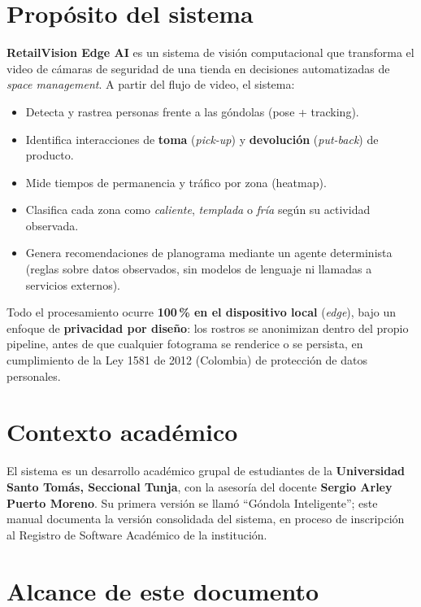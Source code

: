 \documentclass[11pt,a4paper]{report}
\begin{document}
\section{Propósito del sistema}

\textbf{RetailVision Edge AI} es un sistema de visión computacional que transforma el video de
cámaras de seguridad de una tienda en decisiones automatizadas de \textit{space management}.
A partir del flujo de video, el sistema:

\begin{itemize}
  \item Detecta y rastrea personas frente a las góndolas (pose + tracking).
  \item Identifica interacciones de \textbf{toma} (\textit{pick-up}) y \textbf{devolución}
        (\textit{put-back}) de producto.
  \item Mide tiempos de permanencia y tráfico por zona (heatmap).
  \item Clasifica cada zona como \textit{caliente}, \textit{templada} o \textit{fría} según su
        actividad observada.
  \item Genera recomendaciones de planograma mediante un agente determinista (reglas sobre datos
        observados, sin modelos de lenguaje ni llamadas a servicios externos).
\end{itemize}

Todo el procesamiento ocurre \textbf{100\,\% en el dispositivo local} (\textit{edge}), bajo un
enfoque de \textbf{privacidad por diseño}: los rostros se anonimizan dentro del propio pipeline,
antes de que cualquier fotograma se renderice o se persista, en cumplimiento de la Ley 1581 de
2012 (Colombia) de protección de datos personales.

\section{Contexto académico}

El sistema es un desarrollo académico grupal de estudiantes de la \textbf{Universidad Santo Tomás,
Seccional Tunja}, con la asesoría del docente \textbf{Sergio Arley Puerto Moreno}. Su primera
versión se llamó ``Góndola Inteligente''; este manual documenta la versión consolidada del sistema,
en proceso de inscripción al Registro de Software Académico de la institución.

\section{Alcance de este documento}
\end{document}
